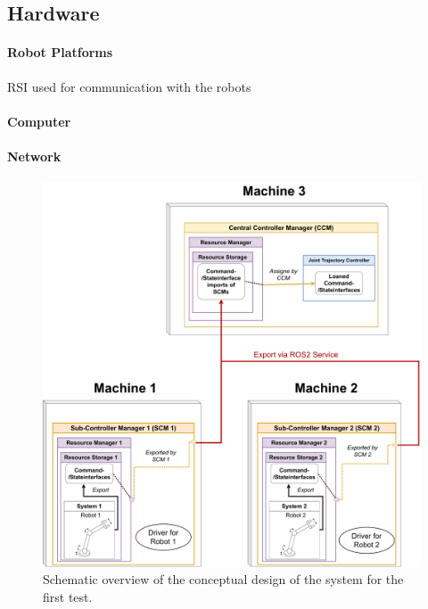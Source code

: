 \subsection{Hardware}
\paragraph{Robot Platforms}
RSI used for communication with the robots
\paragraph{Computer}
\paragraph{Network}
\begin{figure}[htbp]
	\centering
	\includegraphics[width=1\textwidth]{Figures/c6/test_scenario_1.pdf}
	\caption{Schematic overview of the conceptual design of the system for the first test.}
	\label{c6_fig_test_scenario_1}
\end{figure}
